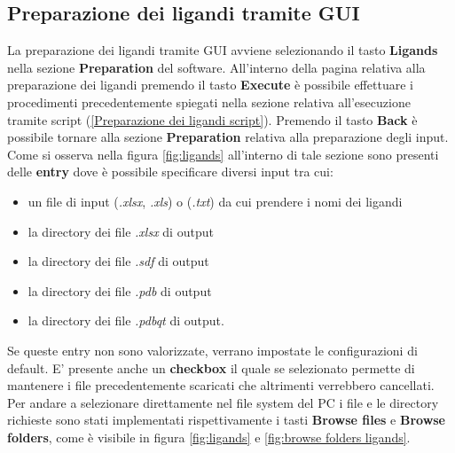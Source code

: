 \subsection{Preparazione dei ligandi tramite GUI}
La preparazione dei ligandi tramite GUI avviene selezionando il tasto \textbf{Ligands} nella sezione \textbf{Preparation} del software. All'interno della pagina relativa alla preparazione dei ligandi premendo il tasto \textbf{Execute} è possibile effettuare i procedimenti precedentemente spiegati nella sezione relativa all'esecuzione tramite script (\ref{Preparazione dei ligandi script}). Premendo il tasto \textbf{Back} è possibile tornare alla sezione \textbf{Preparation} relativa alla preparazione degli input.
Come si osserva nella figura \ref{fig:ligands} all'interno di tale sezione sono presenti delle \textbf{entry} dove è possibile specificare diversi input tra cui:

\begin{itemize}
    \item un file di input (\textit{.xlsx}, \textit{.xls}) o (\textit{.txt}) da cui prendere i nomi dei ligandi
    \item la directory dei file \textit{.xlsx} di output
    \item la directory dei file \textit{.sdf} di output
    \item la directory dei file \textit{.pdb} di output
    \item la directory dei file \textit{.pdbqt} di output.
\end{itemize}

Se queste entry non sono valorizzate, verrano impostate le configurazioni di default. E' presente anche un \textbf{checkbox} il quale se selezionato permette di mantenere i file precedentemente scaricati che altrimenti verrebbero cancellati.\newline
Per andare a selezionare direttamente nel file system del PC i file e le directory richieste sono stati implementati rispettivamente i tasti \textbf{Browse files} e \textbf{Browse folders}, come è visibile in figura \ref{fig:ligands} e \ref{fig:browse folders ligands}.

